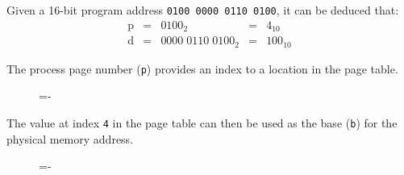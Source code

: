 \documentclass[a4paper]{systems-software}
\begin{document}
Given a 16-bit program address \texttt{0100 0000 0110 0100}, it can be deduced that:
\begin{equation*}
	\begin{aligned}
		\text{p} & = & 0100_{2} & = & 4_{10} \\
		\text{d} & = & 0000\;0110\;0100_{2} & = & 100_{10}
	\end{aligned}
\end{equation*}

The process page number (\texttt{p}) provides an index to a location in the page table.

\begin{figure}[H]
  \lineskip=-\fboxrule
\end{figure}

The value at index \texttt{4} in the page table can then be used as the base (\texttt{b}) for the physical memory address.

\begin{figure}[H]
  \lineskip=-\fboxrule
\end{figure}
\end{document}
